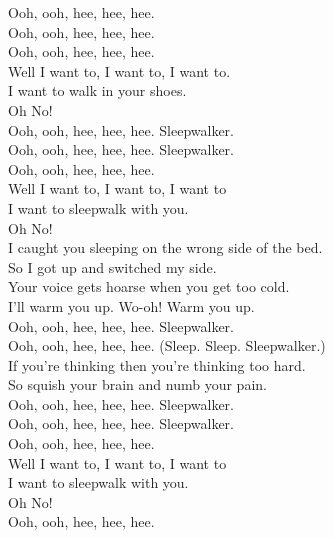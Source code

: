 



Ooh, ooh, hee, hee, hee. \\
Ooh, ooh, hee, hee, hee. \\
Ooh, ooh, hee, hee, hee. \\
Well I want to, I want to, I want to. \\
I want to walk in your shoes. \\
Oh No! \\

Ooh, ooh, hee, hee, hee. Sleepwalker. \\
Ooh, ooh, hee, hee, hee. Sleepwalker. \\
Ooh, ooh, hee, hee, hee. \\
Well I want to, I want to, I want to \\
I want to sleepwalk with you. \\
Oh No! \\

I caught you sleeping on the wrong side of the bed. \\
So I got up and switched my side. \\
Your voice gets hoarse when you get too cold. \\
I'll warm you up. Wo-oh! Warm you up. \\
Ooh, ooh, hee, hee, hee. Sleepwalker. \\
Ooh, ooh, hee, hee, hee. (Sleep. Sleep. Sleepwalker.) \\

If you're thinking then you're thinking too hard. \\
So squish your brain and numb your pain. \\

Ooh, ooh, hee, hee, hee. Sleepwalker. \\
Ooh, ooh, hee, hee, hee. Sleepwalker. \\
Ooh, ooh, hee, hee, hee. \\
Well I want to, I want to, I want to \\
I want to sleepwalk with you. \\
Oh No! \\
Ooh, ooh, hee, hee, hee. \\


